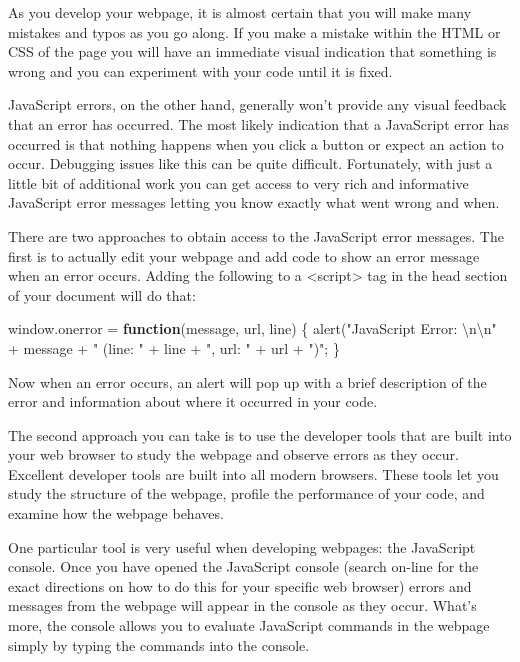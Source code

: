 \documentclass[]{memoir}
\newenvironment{Shaded}{}{}
\newcommand{\KeywordTok}[1]{\textcolor[rgb]{0.00,0.44,0.13}{\textbf{{#1}}}}
\newcommand{\CharTok}[1]{\textcolor[rgb]{0.25,0.44,0.63}{{#1}}}
\newcommand{\StringTok}[1]{\textcolor[rgb]{0.25,0.44,0.63}{{#1}}}
\newcommand{\OtherTok}[1]{\textcolor[rgb]{0.00,0.44,0.13}{{#1}}}
\newcommand{\FunctionTok}[1]{\textcolor[rgb]{0.02,0.16,0.49}{{#1}}}
\newcommand{\NormalTok}[1]{{#1}}
\begin{document}
As you develop your webpage, it is almost certain that you will make
many mistakes and typos as you go along. If you make a mistake within
the HTML or CSS of the page you will have an immediate visual indication
that something is wrong and you can experiment with your code until it
is fixed.

JavaScript errors, on the other hand, generally won't provide any visual
feedback that an error has occurred. The most likely indication that a
JavaScript error has occurred is that nothing happens when you click a
button or expect an action to occur. Debugging issues like this can be
quite difficult. Fortunately, with just a little bit of additional work
you can get access to very rich and informative JavaScript error
messages letting you know exactly what went wrong and when.

There are two approaches to obtain access to the JavaScript error
messages. The first is to actually edit your webpage and add code to
show an error message when an error occurs. Adding the following to a
\textless{}script\textgreater{} tag in the head section of your document
will do that:

\begin{Shaded}
\begin{Highlighting}[]
\OtherTok{window}\NormalTok{.}\FunctionTok{onerror} \NormalTok{= }\KeywordTok{function}\NormalTok{(message, url, line) \{}
  \FunctionTok{alert}\NormalTok{(}\StringTok{"JavaScript Error: }\CharTok{\textbackslash{}n\textbackslash{}n}\StringTok{"} \NormalTok{+ message + }\StringTok{" (line: "} \NormalTok{+ line + }\StringTok{", url: "} \NormalTok{+ url + }\StringTok{")"}\NormalTok{;}
\NormalTok{\}}
\end{Highlighting}
\end{Shaded}

Now when an error occurs, an alert will pop up with a brief description
of the error and information about where it occurred in your code.

The second approach you can take is to use the developer tools that are
built into your web browser to study the webpage and observe errors as
they occur. Excellent developer tools are built into all modern
browsers. These tools let you study the structure of the webpage,
profile the performance of your code, and examine how the webpage
behaves.

One particular tool is very useful when developing webpages: the
JavaScript console. Once you have opened the JavaScript console (search
on-line for the exact directions on how to do this for your specific web
browser) errors and messages from the webpage will appear in the console
as they occur. What's more, the console allows you to evaluate
JavaScript commands in the webpage simply by typing the commands into
the console.
\end{document}
